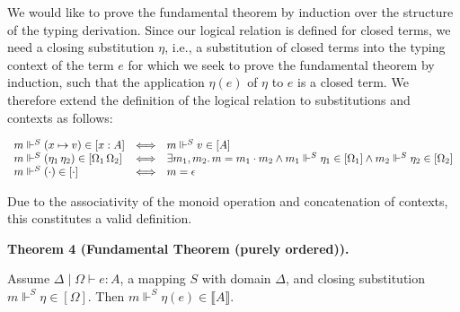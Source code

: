 \documentclass[10pt,a4paper]{amsart}
\begin{document}
 
 
We would like to prove the fundamental theorem by induction over the structure of the typing derivation. Since our logical relation is defined for closed terms, we need a closing substitution $\eta$, i.e., a substitution of closed terms into the typing context of the term $e$ for which we seek to prove the fundamental theorem by induction, such that the application $\eta(e)$ of $\eta$ to $e$ is a closed term. We therefore extend the definition of the logical relation to substitutions and contexts as follows:\par
 
 
  
\par  \quad  \[\begin{array}[]{lcl}m\Vdash^{S}(x\mapsto v)\in[x:A]&\Longleftrightarrow&m\Vdash^{S}v\in[A]\\
m\Vdash^{S}(\eta_{1}\,\eta_{2})\in[\Omega_{1}\,\Omega_{2}]&\Longleftrightarrow&\exists m_{1},m_{2}.\,m=m_{1}\cdot m_{2}\land m_{1}\Vdash^{S}\eta_{1}\in[\Omega_{1}]\land m_{2}\Vdash^{S}\eta_{2}\in[\Omega_{2}]\\
m\Vdash^{S}(\cdot)\in[\cdot]&\Longleftrightarrow&m=\epsilon\end{array}\]\quad  \quad  
  
Due to the associativity of the monoid operation and concatenation of contexts, this constitutes a valid definition.\par
 
 
 
\par\medskip\noindent\textbf{Theorem 4 (Fundamental Theorem (purely ordered)).}\par
 
 
Assume $\Delta\mid\Omega\vdash e:A$, a mapping $S$ with domain $\Delta$, and closing substitution $m\Vdash^{S}\eta\in[\Omega]$. Then $m\Vdash^{S}\eta(e)\in\llbracket A\rrbracket$.\par
 
 
 
 
\end{document}
